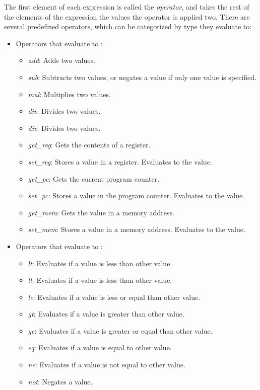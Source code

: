 The first element of each expression is called the \textit{operator}, and takes the rest of the elements of the expression the values the operator is applied two. There are several predefined operators, which can be categorized by type they evaluate to:
\begin{itemize}
  \item Operators that evaluate to :
  \begin{itemize}
    \item \textit{add}: Adds two values.
    \item \textit{sub}: Subtracts two values, or negates a value if only one value is specified.
    \item \textit{mul}: Multiplies two values.
    \item \textit{div}: Divides two values.
    \item \textit{div}: Divides two values.
    \item \textit{get\_reg}: Gets the contents of a register.
    \item \textit{set\_reg}: Stores a value in a register. Evaluates to the value.
    \item \textit{get\_pc}: Gets the current \gls{program counter}.
    \item \textit{set\_pc}: Stores a value in the \gls{program counter}. Evaluates to the value.
    \item \textit{get\_mem}: Gets the value in a memory address.
    \item \textit{set\_mem}: Stores a value in a memory address. Evaluates to the value.
  \end{itemize}
  \item Operators that evaluate to :
  \begin{itemize}
    \item \textit{lt}: Evaluates if a value is less than other value.
    \item \textit{lt}: Evaluates if a value is less than other value.
    \item \textit{le}: Evaluates if a value is less or equal than other value.
    \item \textit{gt}: Evaluates if a value is greater than other value.
    \item \textit{ge}: Evaluates if a value is greater or equal than other value.
    \item \textit{eq}: Evaluates if a value is equal to other value.
    \item \textit{ne}: Evaluates if a value is not equal to other value.
    \item \textit{not}: Negates a value.
  \end{itemize}
\end{itemize}

